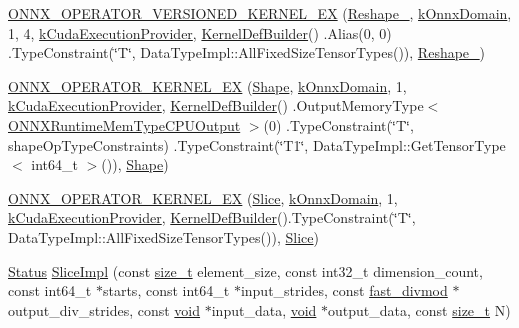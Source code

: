 \begin{DoxyCompactItemize}
\item 
\mbox{\hyperlink{namespaceonnxruntime_1_1cuda_a491bba1dc48c2874c9d3172a66d44ab2}{O\+N\+N\+X\+\_\+\+O\+P\+E\+R\+A\+T\+O\+R\+\_\+\+V\+E\+R\+S\+I\+O\+N\+E\+D\+\_\+\+K\+E\+R\+N\+E\+L\+\_\+\+EX}} (\mbox{\hyperlink{classonnxruntime_1_1cuda_1_1Reshape__1}{Reshape\+\_}}, \mbox{\hyperlink{namespaceonnxruntime_ac0e7c0c106a2c9e9594560a3ab289fa0}{k\+Onnx\+Domain}}, 1, 4, \mbox{\hyperlink{namespaceonnxruntime_a73ebc64887ddd1968e3cef47ffefe35b}{k\+Cuda\+Execution\+Provider}}, \mbox{\hyperlink{classonnxruntime_1_1KernelDefBuilder}{Kernel\+Def\+Builder}}() .Alias(0, 0) .Type\+Constraint(\char`\"{}T\char`\"{}, Data\+Type\+Impl\+::\+All\+Fixed\+Size\+Tensor\+Types()), \mbox{\hyperlink{classonnxruntime_1_1cuda_1_1Reshape__1}{Reshape\+\_}})
\item 
\mbox{\hyperlink{namespaceonnxruntime_1_1cuda_a4e6b4f1a645b8d0bdca059521d21606e}{O\+N\+N\+X\+\_\+\+O\+P\+E\+R\+A\+T\+O\+R\+\_\+\+K\+E\+R\+N\+E\+L\+\_\+\+EX}} (\mbox{\hyperlink{classonnxruntime_1_1Shape}{Shape}}, \mbox{\hyperlink{namespaceonnxruntime_ac0e7c0c106a2c9e9594560a3ab289fa0}{k\+Onnx\+Domain}}, 1, \mbox{\hyperlink{namespaceonnxruntime_a73ebc64887ddd1968e3cef47ffefe35b}{k\+Cuda\+Execution\+Provider}}, \mbox{\hyperlink{classonnxruntime_1_1KernelDefBuilder}{Kernel\+Def\+Builder}}() .Output\+Memory\+Type$<$ \mbox{\hyperlink{allocator__info_8h_add3f8ee3ff93395704abae71c30cab18a59888d12290735245a1b8afb40f64331}{O\+N\+N\+X\+Runtime\+Mem\+Type\+C\+P\+U\+Output}} $>$(0) .Type\+Constraint(\char`\"{}T\char`\"{}, shape\+Op\+Type\+Constraints) .Type\+Constraint(\char`\"{}T1\char`\"{}, Data\+Type\+Impl\+::\+Get\+Tensor\+Type$<$ int64\+\_\+t $>$()), \mbox{\hyperlink{classonnxruntime_1_1Shape}{Shape}})
\item 
\mbox{\hyperlink{namespaceonnxruntime_1_1cuda_a747131a6ed7fa768a2c34f87df86fc64}{O\+N\+N\+X\+\_\+\+O\+P\+E\+R\+A\+T\+O\+R\+\_\+\+K\+E\+R\+N\+E\+L\+\_\+\+EX}} (\mbox{\hyperlink{classonnxruntime_1_1cuda_1_1Slice}{Slice}}, \mbox{\hyperlink{namespaceonnxruntime_ac0e7c0c106a2c9e9594560a3ab289fa0}{k\+Onnx\+Domain}}, 1, \mbox{\hyperlink{namespaceonnxruntime_a73ebc64887ddd1968e3cef47ffefe35b}{k\+Cuda\+Execution\+Provider}}, \mbox{\hyperlink{classonnxruntime_1_1KernelDefBuilder}{Kernel\+Def\+Builder}}().Type\+Constraint(\char`\"{}T\char`\"{}, Data\+Type\+Impl\+::\+All\+Fixed\+Size\+Tensor\+Types()), \mbox{\hyperlink{classonnxruntime_1_1cuda_1_1Slice}{Slice}})
\item 
\mbox{\hyperlink{classonnxruntime_1_1common_1_1Status}{Status}} \mbox{\hyperlink{namespaceonnxruntime_1_1cuda_a678b6e6f4618cbc0b55e3a68111d894d}{Slice\+Impl}} (const \mbox{\hyperlink{mlasi_8h_a503efbc1c6e50825320ad909366b78ab}{size\+\_\+t}} element\+\_\+size, const int32\+\_\+t dimension\+\_\+count, const int64\+\_\+t $\ast$starts, const int64\+\_\+t $\ast$input\+\_\+strides, const \mbox{\hyperlink{classonnxruntime_1_1cuda_1_1fast__divmod}{fast\+\_\+divmod}} $\ast$output\+\_\+div\+\_\+strides, const \mbox{\hyperlink{mlasi_8h_a88f941d423cb2a819b70a1358982b1a6}{void}} $\ast$input\+\_\+data, \mbox{\hyperlink{mlasi_8h_a88f941d423cb2a819b70a1358982b1a6}{void}} $\ast$output\+\_\+data, const \mbox{\hyperlink{mlasi_8h_a503efbc1c6e50825320ad909366b78ab}{size\+\_\+t}} N)

\end{DoxyCompactItemize}
